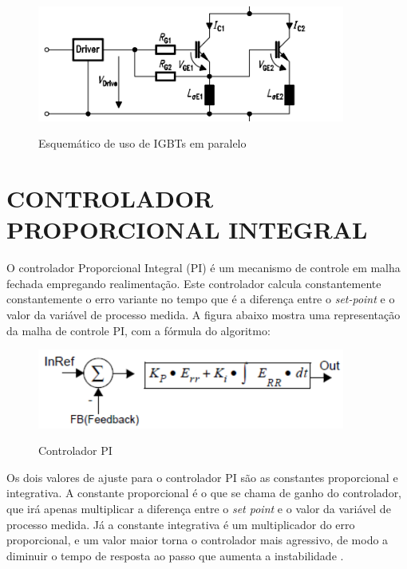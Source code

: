 \begin{figure}[!htb]
    \centering
    \caption{Esquemático de uso de IGBTs em paralelo}
    \includegraphics[width=0.9\textwidth]{./dados/figuras/paralleligbt}
    \label{fig:figura-paralleligbt}
\end{figure}

\section{CONTROLADOR PROPORCIONAL INTEGRAL}
\label{sec:pi-controller}
O controlador Proporcional Integral (PI) é um mecanismo de controle em malha fechada empregando realimentação. Este controlador calcula constantemente constantemente o erro variante no tempo que é a diferença entre o \textit{set-point} e o valor da variável de processo medida. A figura abaixo mostra uma representação da malha de controle PI, com a fórmula do algoritmo:

\begin{figure}[H]
    \centering
    \caption{Controlador PI}
    \includegraphics[width=0.9\textwidth]{./dados/figuras/pi-controller}
    \label{fig:figura-pi-controller}
\end{figure}

Os dois valores de ajuste para o controlador PI são as constantes proporcional e integrativa. A constante proporcional é o que se chama de ganho do controlador, que irá apenas multiplicar a diferença entre o \textit{set point} e o valor da variável de processo medida. Já a constante integrativa é um multiplicador do erro proporcional, e um valor maior torna o controlador mais agressivo, de modo a diminuir o tempo de resposta ao passo que aumenta a instabilidade \cite{Apmonitor}.

